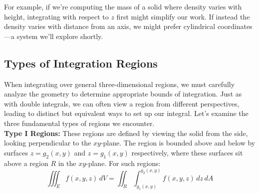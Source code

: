\noindent For example, if we're computing the mass of a solid where density varies with height, integrating with respect to $z$ first might simplify our work. If instead the density varies with distance from an axis, we might prefer cylindrical coordinates—a system we'll explore shortly.


\subsection*{Types of Integration Regions}    

\noindent When integrating over general three-dimensional regions, we must carefully analyze the geometry to determine appropriate bounds of integration. Just as with double integrals, we can often view a region from different perspectives, leading to distinct but equivalent ways to set up our integral. Let's examine the three fundamental types of regions we encounter. \\

\noindent \textbf{Type I Regions:}  These regions are defined by viewing the solid from the side, looking perpendicular to the $xy$-plane. The region is bounded above and below by surfaces $z = g_2(x,y)$ and $z = g_1(x,y)$ respectively, where these surfaces sit above a region $R$ in the $xy$-plane. For such regions:
\[
\iiint_E f(x,y,z)\,dV = \iint_R\int_{g_1(x,y)}^{g_2(x,y)} f(x,y,z)\,dz\,dA
\]

